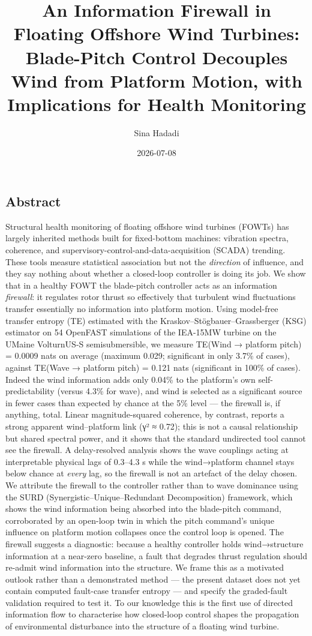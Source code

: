 \documentclass[
  english,
  11pt,
]{article}
\title{An Information Firewall in Floating Offshore Wind Turbines:
Blade-Pitch Control Decouples Wind from Platform Motion, with
Implications for Health Monitoring}
\author{Sina Hadadi}
\date{2026-07-08}
\begin{document}
\maketitle

\subsection{Abstract}\label{abstract}

Structural health monitoring of floating offshore wind turbines (FOWTs)
has largely inherited methods built for fixed-bottom machines: vibration
spectra, coherence, and supervisory-control-and-data-acquisition (SCADA)
trending. These tools measure statistical association but not the
\emph{direction} of influence, and they say nothing about whether a
closed-loop controller is doing its job. We show that in a healthy FOWT
the blade-pitch controller acts as an information \emph{firewall}: it
regulates rotor thrust so effectively that turbulent wind fluctuations
transfer essentially no information into platform motion. Using
model-free transfer entropy (TE) estimated with the
Kraskov--Stögbauer--Grassberger (KSG) estimator on 54 OpenFAST
simulations of the IEA-15MW turbine on the UMaine VolturnUS-S
semisubmersible, we measure TE(Wind → platform pitch) = 0.0009 nats on
average (maximum 0.029; significant in only 3.7\% of cases), against
TE(Wave → platform pitch) = 0.121 nats (significant in 100\% of cases).
Indeed the wind information adds only 0.04\% to the platform's own
self-predictability (versus 4.3\% for wave), and wind is selected as a
significant source in fewer cases than expected by chance at the 5\%
level --- the firewall is, if anything, total. Linear magnitude-squared
coherence, by contrast, reports a strong apparent wind--platform link
(γ² ≈ 0.72); this is not a causal relationship but shared spectral
power, and it shows that the standard undirected tool cannot see the
firewall. A delay-resolved analysis shows the wave couplings acting at
interpretable physical lags of 0.3--4.3 s while the wind→platform
channel stays below chance at \emph{every} lag, so the firewall is not
an artefact of the delay chosen. We attribute the firewall to the
controller rather than to wave dominance using the SURD
(Synergistic--Unique--Redundant Decomposition) framework, which shows
the wind information being absorbed into the blade-pitch command,
corroborated by an open-loop twin in which the pitch command's unique
influence on platform motion collapses once the control loop is opened.
The firewall suggests a diagnostic: because a healthy controller holds
wind→structure information at a near-zero baseline, a fault that
degrades thrust regulation should re-admit wind information into the
structure. We frame this as a motivated outlook rather than a
demonstrated method --- the present dataset does not yet contain
computed fault-case transfer entropy --- and specify the graded-fault
validation required to test it. To our knowledge this is the first use
of directed information flow to characterise how closed-loop control
shapes the propagation of environmental disturbance into the structure
of a floating wind turbine.
\end{document}
